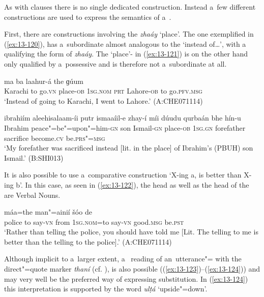  As with  clauses there is no single dedicated  construction. Instead a~few different constructions are used to express the semantics of a~.


First, there are constructions involving the  \textit{zhaáy} `place'. The one exemplified in (\ref{ex:13-120}), has a~subordinate  almost analogous to the  `instead of{\ldots}', with a~ qualifying the  form of \textit{zhaáy}. The `place'- in (\ref{ex:13-121}) is on the other hand only qualified by a~possessive  and is therefore not a~subordinate  at all. 

\begin{exe}
\ex
\label{ex:13-120}
 ma ba laahur-á  the ɡúum \\
Karachi to go.\textsc{vn} place-\textsc{ob} \textsc{1sg.nom} \textsc{prt} Lahore-\textsc{ob} to go.\textsc{pfv.msg} \\
\glt `Instead of going to Karachi, I went to Lahore.' (A:CHE071114)

\ex
\label{ex:13-121}
\gll ibrahiím aleehisalaam-íi putr ismaaíil-e zhay-í  míi dúudu qurbaán bhe hín-u \\
Ibrahim peace"=be"=upon"=him-\textsc{gn} son Ismail-\textsc{gn} place-\textsc{ob}  \textsc{1sg.gn} forefather sacrifice become.\textsc{cv} be.\textsc{prs"=msg} \\
\glt `My forefather was sacrificed instead [lit. in the place] of Ibrahim's (PBUH) son Ismail.' (B:SHI013) 
\end{exe}

It is also possible to use a~comparative construction `X-ing a, is better than X-ing b'. In this case, as seen in (\ref{ex:13-122}), the  head as well as the head of the    are Verbal Nouns.

\begin{exe}
\ex
\label{ex:13-122}
\gll [pulusá the man"=ainií díi] máa=the man"=ainií šóo de \\
police to say-\textsc{vn} from \textsc{1sg.nom=}to say-\textsc{vn} good.\textsc{msg} be.\textsc{pst} \\
\glt `Rather than telling the police, you should have told me [Lit. The telling to me is better than the telling to the police].' (A:CHE071114) 
\end{exe}

Although implicit to a~larger extent, a~ reading of an~utterance"= with the direct"=quote marker \textit{thaní} (cf. ), is also possible ((\ref{ex:13-123})--(\ref{ex:13-124})) and may very well be the preferred way of expressing substitution. In (\ref{ex:13-124}) this interpretation is supported by the word \textit{ulṭá} `upside"=down'.

